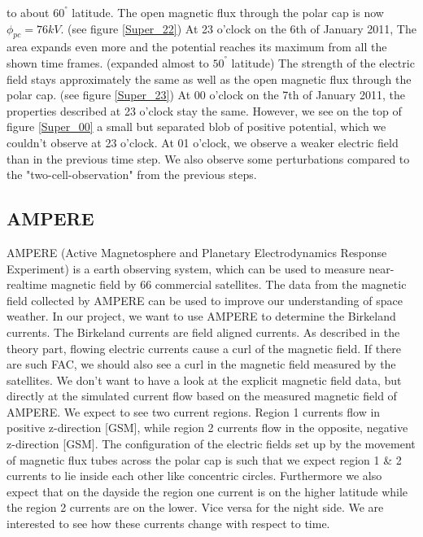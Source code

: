\documentclass[10pt,a4paper]{article}
\begin{document}
to about $60^{°}$ latitude. The open magnetic flux through the polar cap is now $\phi_{pc}=76 k V$. (see figure \ref{Super_22})
At 23 o'clock on the 6th of January 2011, The area expands even more and the potential reaches its maximum from all the shown time frames. (expanded almost to $50^{°}$ 
latitude) The strength of the electric field stays approximately the same as well as the open magnetic flux through the polar cap. (see figure \ref{Super_23})
At 00 o'clock on the 7th of January 2011, the properties described at 23 o'clock stay the same. However, we see on the top of figure \ref{Super_00} a small but 
separated blob of positive potential, which we couldn't observe at 23 o'clock.
At 01 o'clock, we observe a weaker electric field than in the previous time step. We also observe some perturbations compared to the  "two-cell-observation" from the 
previous steps. 


\subsection{AMPERE \label{0_CHAPTER_AMPERE}}
AMPERE (Active Magnetosphere and Planetary Electrodynamics Response Experiment) is a earth observing system, which can be used to measure near-realtime magnetic 
field by 66 commercial satellites. The data from the magnetic field collected by AMPERE can be used to improve our understanding of space weather. In our project, 
we want to use AMPERE to determine the Birkeland currents. The Birkeland currents are field aligned currents. As described in the theory part, flowing electric currents 
cause a curl of the magnetic field. If there are such FAC, we should also see a curl in the magnetic field measured by the satellites.
We don't want to have a look at the explicit magnetic field data, but directly at the simulated current flow based on the measured magnetic field of AMPERE. We expect to 
see two current regions. Region 1 currents flow in positive z-direction [GSM], while region 2 currents flow in the opposite, negative z-direction [GSM]. The configuration 
of the electric fields set up by the movement of magnetic flux tubes across the polar cap is such that we expect region 1 \& 2 currents to lie inside each other like 
concentric circles. Furthermore we also expect that on the dayside the region one current is on the higher latitude while the region 2 currents are on the lower. Vice 
versa for the night side. We are interested to see how these currents change with respect to time.  
\end{document}
